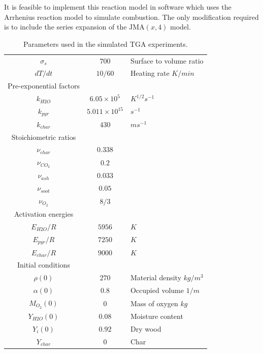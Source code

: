 \documentclass[reqno]{amsart}
\newcommand{\JMA}{\text{JMA}}
\begin{document}
It is feasible to implement this reaction model in software which uses the Arrhenius reaction model to simulate combustion.  
The only modification required is to include the series expansion of the $\JMA(x,4)$ model. 

\newpage

\begin{table}
\centering
\begin{tabular}{c c l}
\hline
  $\sigma_s$ & $700$ & Surface to volume ratio \\
  $dT/dt$ & $10/60$ & Heating rate $K/min$\\
\hline
  Pre-exponential factors & &\\ 
  $k_{H2O}$ & $6.05\times 10^5$ & $K^{1/2}s^{-1}$\\
  $k_{pyr}$ & $5.011\times 10^15$ & $s^{-1}$ \\
  $k_{char}$& $430$ & $ms^{-1}$ \\
%
\hline
  Stoichiometric ratios & &\\
  $\nu_{char}$ & $0.338$& \\ %
  $\nu_{CO_2}$ & $0.2$&\\ %
  $\nu_{ash}$ & $0.033$&\\ %
  $\nu_{soot}$ & $0.05$&\\ %
  $\nu_{O_2}$ & $8/3$&\\ %
%
\hline
 Activation energies & & \\
  $E_{H2O}/R$ & $5956$ & $K$ \\
  $E_{pyr}/R$ & $7250$ & $K$ \\
  $E_{char}/R$& $9000$ & $K$ \\
%
\hline
   Initial conditions & & \\
   $\rho(0)$ & $270$ & Material density $kg/m^3$\\
   $\alpha(0)$ & $0.8$ & Occupied volume $1/m$\\
   $M_{O_2}(0)$ & $0$ & Mass of oxygen $kg$ \\
   $Y_{H2O}(0)$ & $0.08$ & Moisture content\\
   $Y_{i}(0)$ & $0.92$ & Dry wood\\
   $Y_{char}$ & $0$ & Char \\
\hline
\end{tabular}
\caption{Parameters used in the simulated TGA experiments.}
\label{tab:parameters}
\end{table}
\end{document}
